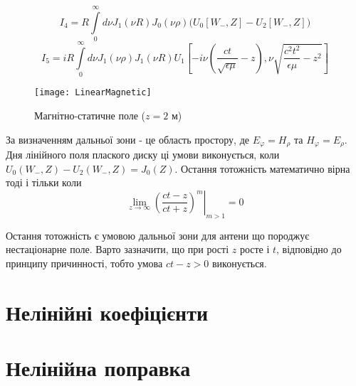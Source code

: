 %
\begin{equation*}
I_4 = R \int \limits_{0}^{\infty} d\nu J_1(\nu R) J_0(\nu \rho)
\Big( U_0[ W_-, Z ] - U_2[ W_-, Z ] \Big) 
\end{equation*}
%
\begin{equation*}
I_5 = i R \int \limits_0^\infty 
d \nu J_1(\nu \rho) J_1 (\nu R)
U_1 \left[ -i \nu \left( \frac{ct}{\sqrt{\epsilon \mu}} - z \right), 
\nu \sqrt{\frac{c^2t^2}{\epsilon \mu}-z^2} \right]
\end{equation*}
%
\begin{figure}[h] \begin{center}
\texttt{[image: LinearMagnetic]}
\caption{Магнітно-статичне поле ($ z = 2 $ м)} \label{fig:emp_h_rho}
\end{center} \end{figure}

За визначенням дальньої зони - це область простору, де $ E_\varphi = H_\rho $ та
$ H_\varphi = E_\rho $. Дня лінійного поля плаского диску ці умови виконується, 
коли $ U_0(W_-,Z) - U_2(W_-,Z) = J_0(Z) $. Остання тотожність математично вірна
тоді і тільки коли 
%
\begin{equation} \label{eq:FraunhoferDistance}
\left. \lim_{z \to \infty} \left( \frac{ct-z}{ct+z} \right)^m 
\right|_{m > 1} = 0
\end{equation}

Остання тотожність є умовою дальньої зони для антени що породжує 
нестаціонарне поле. Варто зазначити, що при рості $ z $ росте і $ t $, 
відповідно до принципу причинності, тобто умова $ ct - z > 0 $ виконується.

\section{Нелінійні коефіцієнти}

\section{Нелінійна поправка}
